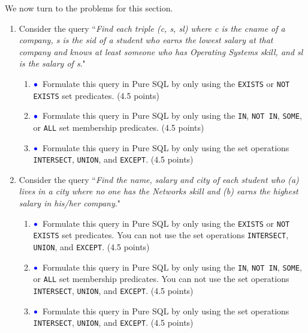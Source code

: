 \documentclass[11pt]{article}
\newcommand{\blue}[1]{{\color{blue}#1}}
\newcommand{\bluebullet}{$\blue{\bullet}$}
\begin{document}
\newpage
We now turn to the problems for this section.
\begin{enumerate}[resume]
\item\label{queryTwo}   
Consider the query ``\emph{Find each triple (c, s, sl) where c is the cname of a company, s is the sid of a student who earns the lowest salary at that company and knows at least someone who has Operating Systems skill, and sl is the salary of s}."

\begin{enumerate}
\item  \bluebullet\ Formulate this query in Pure SQL by only using the {\tt EXISTS} or {\tt NOT EXISTS} set predicates. (4.5 points)

\item \bluebullet\ Formulate this query in Pure SQL by only using the {\tt  IN}, {\tt NOT IN}, {\tt SOME}, or {\tt ALL} set membership predicates. (4.5 points)

\item  \bluebullet\  Formulate this query in Pure SQL by only using the set operations {\tt INTERSECT}, {\tt UNION}, and {\tt EXCEPT}. (4.5 points)

\end{enumerate}

\item\label{queryThree}  Consider the query ``\emph{Find the name, salary and city of each student who 
(a) lives in a city where no one has the Networks skill and 
(b) earns the highest salary in his/her company}."


\begin{enumerate}
\item  \bluebullet\  Formulate this query in Pure SQL by only using the {\tt EXISTS} or {\tt NOT EXISTS} set predicates.
You can not use the set operations {\tt INTERSECT}, {\tt UNION}, and {\tt EXCEPT}. (4.5 points)

\item  \bluebullet\  Formulate this query in Pure SQL by only using the {\tt  IN}, {\tt NOT IN}, {\tt SOME}, or {\tt ALL} set membership predicates. 
You can not use the set operations {\tt INTERSECT}, {\tt UNION}, and {\tt EXCEPT}. (4.5 points)

\item    \bluebullet\  Formulate this query in Pure SQL by only using the set operations {\tt INTERSECT}, {\tt UNION}, and {\tt EXCEPT}. (4.5 points)

\end{enumerate}



\end{enumerate}
\end{document}

